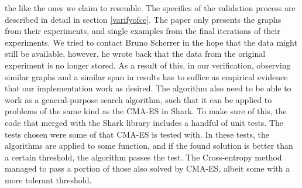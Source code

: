 the like the ones we claim to resemble. The specifics of the validation process
are described in detail in section \ref{varifyofce}. The paper only presents the
graphs from their experiments, and single examples from the final iterations
of their experiments. We tried to contact Bruno Scherrer in the hope that 
the data might still be available, however, he wrote back that the data from the
original experiment is no longer stored. As a result of this, in our verification,
observing similar graphs and a similar span in results has to suffice as 
empirical evidence that our implementation work as desired. 
The algorithm also need to be able to work as a general-purpose 
search algorithm, such that it can be applied to problems of the same kind as 
the CMA-ES in Shark. To make sure of this, the code that merged with the 
Shark library includes a handful of unit tests. The tests chosen were some
of that CMA-ES is tested with. In these tests, the algorithms are applied to some 
function, and if the found solution is better than a certain threshold, the 
algorithm passes the test. The Cross-entropy method managed to pass a portion 
of those also solved by CMA-ES, albeit some with a more tolerant threshold.



